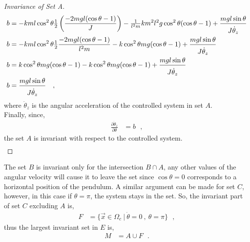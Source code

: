 \begin{proof}[Invariance of Set A]
\begin{align}
    b &= - k m l \cos^2 \theta \tfrac{1}{2} \left(\frac{-2 m g l (\cos \theta -1)}{J}\right)  - \tfrac{1}{l^2 m} k m^2 l^2 g \cos^2 \theta (\cos \theta -1)  +  \frac{m g l \sin \theta}{ J \rule{0pt}{12pt}\dot{\theta}_z} \\
    b &= - k m l \cos^2 \theta \tfrac{1}{2} \frac{-2 m g l (\cos \theta -1)}{l^2 m} - k \cos^2 \theta m g (\cos \theta -1)  +  \frac{m g l \sin \theta}{ J \rule{0pt}{12pt}\dot{\theta}_z}  \\
    b &= k \cos^2 \theta m g (\cos \theta -1) - k \cos^2 \theta m g (\cos \theta -1)  +  \frac{m g l \sin \theta}{ J \rule{0pt}{12pt}\dot{\theta}_z} \\
    b &= \frac{m g l \sin \theta}{ J \rule{0pt}{12pt}\dot{\theta}_z} \ \ \ ,  \label{eq:systemTrajSlopeInSetA}
  \end{align}
  where $\ddot{\theta}_z$ is the angular acceleration of the controlled system in set $A$.\\
  Finally, since,
  \begin{align}
    \frac{\partial \dot{\theta}_z}{\partial \theta} &= b \ \ \ ,  \label{eq:slopesEqual}
  \end{align}
  the set $A$ is invariant with respect to the controlled system.\vspace{-4pt}
  \begin{align}
    \tag*{$\blacksquare\ $}
  \end{align}
\end{proof}
%
\vspace{-8pt}
The set $B$ is invariant only for the intersection $B \cap A$, any other values of the angular velocity will cause it to leave the set since $\cos \theta = 0$ corresponds to a horizontal position of the pendulum. A similar argument can be made for set $C$, however, in this case if $\theta = \pi$, the system stays in the set. So, the invariant part of set $C$ excluding $A$ is,
\begin{align}
  F &=  \{ \vec{x} \in \Omega_c \ | \ \dot{\theta} = 0 \ , \ \theta = \pi \}  \ \ \ ,  \label{eq:F}
\end{align}
thus the largest invariant set in $E$ is,
\begin{align}
M &= A \cup F \ \ \ .  \label{eq:M}
\end{align}
